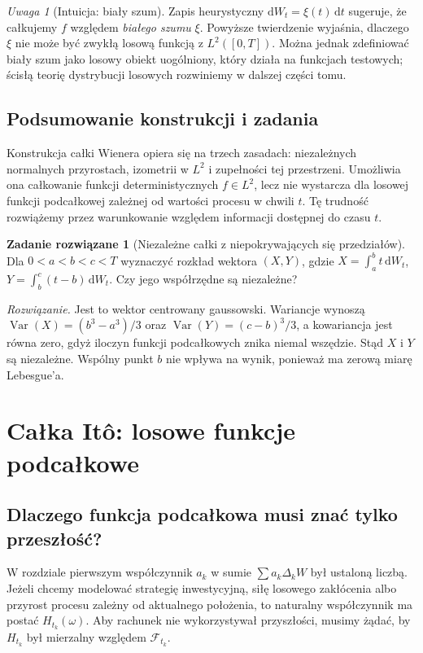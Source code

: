 \documentclass[11pt,a4paper,oneside]{report}
\numberwithin{equation}{chapter}
\theoremstyle{plain}
\theoremstyle{definition}
\newtheorem{zadanie}{Zadanie rozwiązane}[chapter]
\theoremstyle{remark}
\newtheorem{uwaga}{Uwaga}[chapter]
\newcommand{\Var}{\operatorname{Var}}
\newcommand{\calF}{\mathcal{F}}
\newcommand{\dd}{\mathrm{d}}
\begin{document}
\begin{uwaga}[Intuicja: biały szum]
Zapis heurystyczny $\dd W_t=\xi(t)\,\dd t$ sugeruje,
że całkujemy $f$ względem \emph{białego szumu} $\xi$.
Powyższe twierdzenie wyjaśnia, dlaczego $\xi$ nie może
być zwykłą losową funkcją z $L^2([0,T])$. Można jednak
zdefiniować biały szum jako losowy obiekt uogólniony,
który działa na funkcjach testowych; ścisłą teorię
dystrybucji losowych rozwiniemy w dalszej części tomu.
\end{uwaga}

\section{Podsumowanie konstrukcji i zadania}\label{sec:volIII:01:08}
Konstrukcja całki Wienera opiera się na trzech zasadach:
niezależnych normalnych przyrostach, izometrii w $L^2$
i zupełności tej przestrzeni. Umożliwia ona całkowanie
funkcji deterministycznych $f\in L^2$, lecz nie wystarcza
dla losowej funkcji podcałkowej zależnej od wartości
procesu w chwili $t$. Tę trudność rozwiążemy przez
warunkowanie względem informacji dostępnej do czasu $t$.

\begin{zadanie}[Niezależne całki z niepokrywających się przedziałów]
Dla $0<a<b<c<T$ wyznaczyć rozkład wektora
$(X,Y)$, gdzie $X=\int_a^b t\,\dd W_t$,
$Y=\int_b^c (t-b)\,\dd W_t$. Czy jego współrzędne
są niezależne?

\emph{Rozwiązanie.} Jest to wektor centrowany gaussowski.
Wariancje wynoszą $\Var(X)=(b^3-a^3)/3$ oraz
$\Var(Y)=(c-b)^3/3$, a kowariancja jest równa zero,
gdyż iloczyn funkcji podcałkowych znika niemal wszędzie.
Stąd $X$ i $Y$ są niezależne. Wspólny punkt $b$ nie
wpływa na wynik, ponieważ ma zerową miarę Lebesgue'a.
\end{zadanie}

\chapter{Całka Itô: losowe funkcje podcałkowe}
\label{chap:volIII:02}
\par\smallskip{}\par\smallskip

\label{ch:ito-construction}
\section{Dlaczego funkcja podcałkowa musi znać tylko przeszłość?}\label{sec:volIII:02:01}
W rozdziale pierwszym współczynnik $a_k$ w sumie
$\sum a_k\Delta_kW$ był ustaloną liczbą. Jeżeli chcemy
modelować strategię inwestycyjną, siłę losowego zakłócenia
albo przyrost procesu zależny od aktualnego położenia,
to naturalny współczynnik ma postać $H_{t_k}(\omega)$.
Aby rachunek nie wykorzystywał przyszłości, musimy żądać,
by $H_{t_k}$ był mierzalny względem $\calF_{t_k}$.
\end{document}
